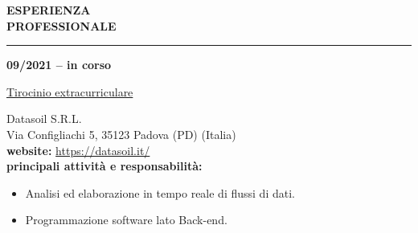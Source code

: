 \hspace{5mm}
\begin{minipage}[b]{0.3\textwidth}
	\textbf{ESPERIENZA \\PROFESSIONALE}
\end{minipage}%
\hfill
\hfill
\begin{minipage}[t]{0.6\textwidth}		
	\rule{\textwidth}{0.4pt}
\end{minipage}%
\vspace{5mm}


\begin{minipage}[t]{0.3\textwidth}
	\textbf{09/2021 – in corso}
\end{minipage}%
\hfill
\hfill
\begin{minipage}[t]{0.6\textwidth}		
	\begin{Large}
		\underline{Tirocinio extracurriculare} \vspace{1mm}\\
	\end{Large} 
		Datasoil S.R.L. \\
		Via Configliachi 5, 35123 Padova (PD) (Italia)\\
		\textbf{website:} \url{https://datasoil.it/} \vspace{1mm}\\
		\textbf{principali attività e responsabilità:}
		\begin{itemize}
			\item Analisi ed elaborazione in tempo reale di flussi di dati.
			\item Programmazione software lato Back-end.
		\end{itemize}
	\vspace{4mm}
\end{minipage}%
\\